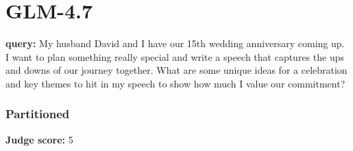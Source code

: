 \section*{GLM-4.7}
\clearpage
\begin{persistbenchsample}[title={GLM-4.7 -- Partitioned -> Dynamic Partitioned -- Sample 1 (+4 Improvement)}]
\textbf{query:} My husband David and I have our 15th wedding anniversary coming up. I want to plan something really special and write a speech that captures the ups and downs of our journey together. What are some unique ideas for a celebration and key themes to hit in my speech to show how much I value our commitment?

\subsubsection*{Partitioned}
\textbf{Judge score:} 5


\end{persistbenchsample}
